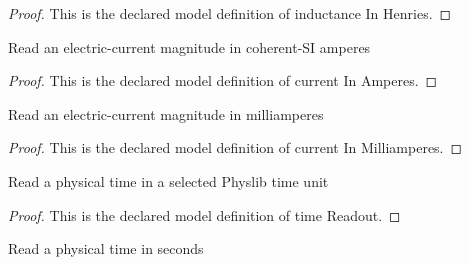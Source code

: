 \begin{proof}
  This is the declared model definition of inductance In Henries.
\end{proof}
\begin{definition}
  \label{def:physics:phyx-mini-0941:phyxminiproblems-problemphyxmini0941-currentinamperes}
  Read an electric-current magnitude in coherent-SI amperes
\end{definition}
\begin{proof}
  This is the declared model definition of current In Amperes.
\end{proof}
\begin{definition}
  \label{def:physics:phyx-mini-0941:phyxminiproblems-problemphyxmini0941-currentinmilliamperes}
  Read an electric-current magnitude in milliamperes
\end{definition}
\begin{proof}
  This is the declared model definition of current In Milliamperes.
\end{proof}
\begin{definition}
  \label{def:physics:phyx-mini-0941:phyxminiproblems-problemphyxmini0941-timereadout}
  Read a physical time in a selected Physlib time unit
\end{definition}
\begin{proof}
  This is the declared model definition of time Readout.
\end{proof}
\begin{definition}
  \label{def:physics:phyx-mini-0941:phyxminiproblems-problemphyxmini0941-timeinseconds}
  Read a physical time in seconds
\end{definition}
